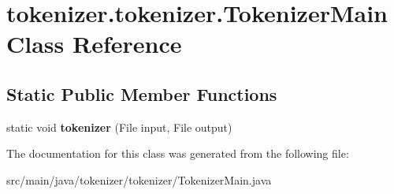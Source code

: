 \hypertarget{classtokenizer_1_1tokenizer_1_1_tokenizer_main}{}\section{tokenizer.\+tokenizer.\+Tokenizer\+Main Class Reference}
\label{classtokenizer_1_1tokenizer_1_1_tokenizer_main}
\subsection*{Static Public Member Functions}
\begin{DoxyCompactItemize}
\item 
\hypertarget{classtokenizer_1_1tokenizer_1_1_tokenizer_main_af3c87c9aca10bc2e7f3fb72caa4af2a6}{}static void {\bfseries tokenizer} (File input, File output)\label{classtokenizer_1_1tokenizer_1_1_tokenizer_main_af3c87c9aca10bc2e7f3fb72caa4af2a6}

\end{DoxyCompactItemize}


The documentation for this class was generated from the following file\+:\begin{DoxyCompactItemize}
\item 
src/main/java/tokenizer/tokenizer/Tokenizer\+Main.\+java\end{DoxyCompactItemize}
